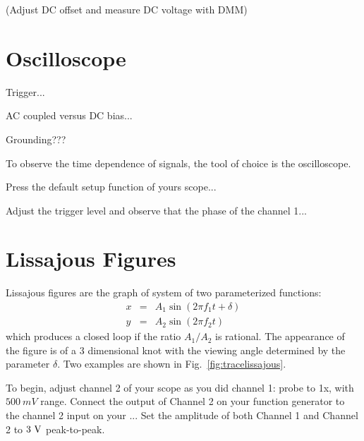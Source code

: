 (Adjust DC offset and measure DC voltage with DMM)




\section{Oscilloscope}

Trigger...

AC coupled versus DC bias...

Grounding???


To observe the time dependence of signals, the tool of choice is the oscilloscope.

Press the default setup function of yours scope...

Adjust the trigger level and observe that the phase of the channel 1...

\section{Lissajous Figures}

Lissajous figures are the graph of system of two parameterized functions:
\begin{eqnarray*}
x &=& A_1 \sin(2 \pi f_1 t + \delta) \\
y &=& A_2 \sin(2 \pi f_2 t) 
\end{eqnarray*}
which produces a closed loop if the ratio $A_1 / A_2$ is rational.  The appearance of the figure is of a 3 dimensional knot with the viewing angle determined by the parameter $\delta$.  Two examples are shown in Fig.~\ref{fig:tracelissajous}.

To begin, adjust channel 2 of your scope as you did channel 1: probe to 1x, with $500~mV$ range.
Connect the output of Channel 2 on your function generator to the channel 2 input on your ...
Set the amplitude of both Channel 1 and Channel 2 to $3~\rm V$ peak-to-peak.

